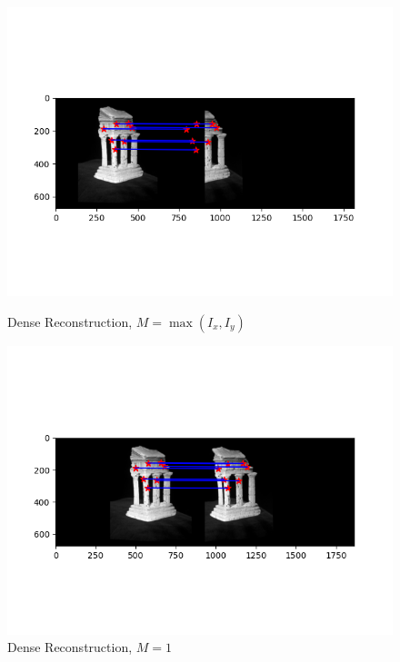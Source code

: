 \begin{figure}[H]
  \centering
  \begin{minipage}{.6\textwidth}
    \centering
    \includegraphics[width=\textwidth]{./figures/02-rectify-test-1.png}
    \caption{Dense Reconstruction, $M = \max(I_x, I_y)$}
  \end{minipage}
  \hfill
  \begin{minipage}{.6\textwidth}
    \centering
    \includegraphics[width=\textwidth]{./figures/02-rectify-test-2.png}
    \caption{Dense Reconstruction, $M = 1$}
  \end{minipage}
\end{figure}

\newpage
